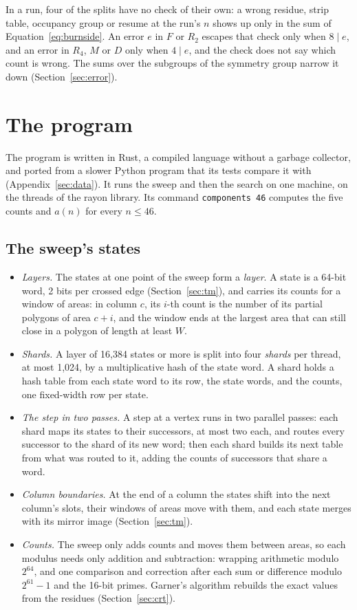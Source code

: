 \documentclass[11pt]{a000104}
\numberwithin{equation}{section}
\begin{document}
In a run, four of the splits have no check of their own: a wrong residue, strip table, occupancy group or resume at the run's $n$ shows up only in the sum of Equation~\eqref{eq:burnside}.
An error $e$ in $F$ or $R_2$ escapes that check only when $8 \mid e$, and an error in $R_4$, $M$ or $D$ only when $4 \mid e$, and the check does not say which count is wrong.
The sums over the subgroups of the symmetry group narrow it down (Section~\ref{sec:error}).

\section{The program}\label{sec:program}

The program is written in Rust, a compiled language without a garbage collector, and ported from a slower Python program that its tests compare it with (Appendix~\ref{sec:data}).
It runs the sweep and then the search on one machine, on the threads of the rayon library.
Its command \texttt{components 46} computes the five counts and $a(n)$ for every $n \le 46$.

\subsection{The sweep's states}

\begin{itemize}
  \item \emph{Layers.} The states at one point of the sweep form a \emph{layer}. A state is a 64-bit word, 2 bits per crossed edge (Section~\ref{sec:tm}), and carries its counts for a window of areas: in column $c$, its $i$-th count is the number of its partial polygons of area $c + i$, and the window ends at the largest area that can still close in a polygon of length at least $W$.
  \item \emph{Shards.} A layer of 16{,}384 states or more is split into four \emph{shards} per thread, at most 1{,}024, by a multiplicative hash of the state word. A shard holds a hash table from each state word to its row, the state words, and the counts, one fixed-width row per state.
  \item \emph{The step in two passes.} A step at a vertex runs in two parallel passes: each shard maps its states to their successors, at most two each, and routes every successor to the shard of its new word; then each shard builds its next table from what was routed to it, adding the counts of successors that share a word.
  \item \emph{Column boundaries.} At the end of a column the states shift into the next column's slots, their windows of areas move with them, and each state merges with its mirror image (Section~\ref{sec:tm}).
  \item \emph{Counts.} The sweep only adds counts and moves them between areas, so each modulus needs only addition and subtraction: wrapping arithmetic modulo $2^{64}$, and one comparison and correction after each sum or difference modulo $2^{61} - 1$ and the 16-bit primes. Garner's algorithm rebuilds the exact values from the residues (Section~\ref{sec:crt}).
\end{itemize}
\end{document}
